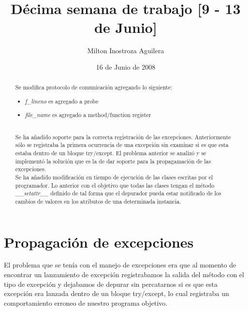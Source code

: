 \documentclass[10pt,a4paper]{article}
\begin{document}
\renewcommand{\contentsname}{Indice} 
\renewcommand\listfigurename{Lista de Figuras}
\renewcommand\listtablename{Lista de Tablas}
\newcommand\bibname{Bibliografía}
\renewcommand{\refname}{Bibliografía}
\renewcommand\indexname{Indice alfabético}
\renewcommand\figurename{Figura}
\renewcommand\tablename{Tabla}
\renewcommand\partname{Parte}
\newcommand\chaptername{Capítulo}
\renewcommand\appendixname{Apéndice}
\renewcommand\abstractname{Resumen}

\title{Décima semana de trabajo [9 - 13 de Junio]}
\author{Milton Inostroza Aguilera}
\date{16 de Junio de 2008}
\clearpage
\maketitle

\begin{abstract}

Se modifica protocolo de comunicación agregando lo siguiente:
\begin{itemize}
\item \textit{f\_lineno} es agregado a probe
\item \textit{file\_name} es agregado a method/function register
\end{itemize}
\\
Se ha añadido soporte para la correcta registración de las excepciones.  Anteriormente sólo se registraba la primera ocurrencia de una excepción sin examinar si es que esta estaba dentro de un bloque try/except.  El problema anterior se analizó y se implementó la solución que es la de dar soporte para la propagamación de las excepciones.\\

Se ha añadido modificación en tiempo de ejecución de las clases escritas por el programador.  Lo anterior con el objetivo que todas las clases tengan el método \textit{\_\_setattr\_\_} definido de tal forma que el depurador pueda estar notificado de los cambios de valores en los atributos de una determinada instancia. 


\end{abstract}
\newpage
\tableofcontents
\newpage
\listoffigures
\newpage
\listoftables
\newpage
\section{Propagación de excepciones}

El problema que se tenía con el manejo de excepciones era que al momento de encontrar un lanzamiento de excepción registrabamos la salida del método con el tipo de excepción y dejabamos de depurar sin percatarnos si es que esta excepción era lanzada dentro de un bloque try/except, lo cual registraba un comportamiento erroneo de nuestro programa objetivo.\\
\end{document}
